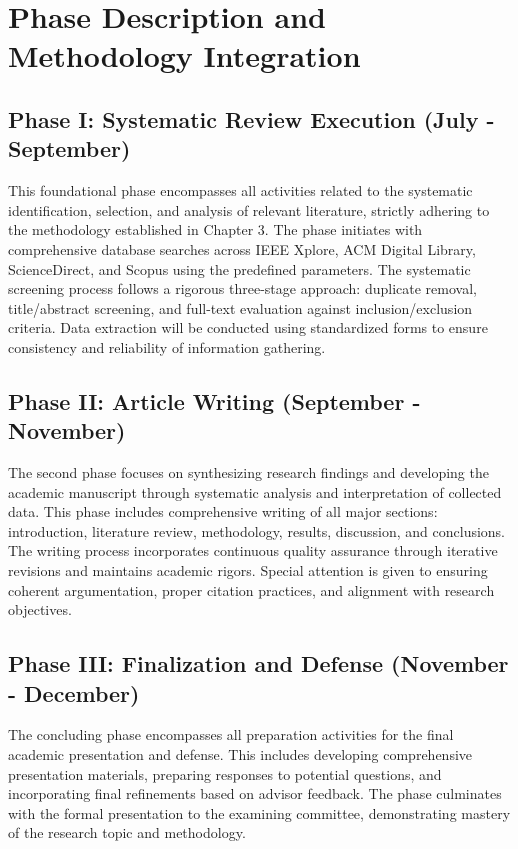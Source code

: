 \documentclass[twoside,brazilian,english]{UNISINOSmonografia}
\begin{document}
\section{Phase Description and Methodology Integration}

\subsection{Phase I: Systematic Review Execution (July - September)}
This foundational phase encompasses all activities related to the systematic identification, selection, and analysis of relevant literature, strictly adhering to the methodology established in Chapter 3. The phase initiates with comprehensive database searches across IEEE Xplore, ACM Digital Library, ScienceDirect, and Scopus using the predefined parameters. The systematic screening process follows a rigorous three-stage approach: duplicate removal, title/abstract screening, and full-text evaluation against inclusion/exclusion criteria. Data extraction will be conducted using standardized forms to ensure consistency and reliability of information gathering.

\subsection{Phase II: Article Writing (September - November)}  
The second phase focuses on synthesizing research findings and developing the academic manuscript through systematic analysis and interpretation of collected data. This phase includes comprehensive writing of all major sections: introduction, literature review, methodology, results, discussion, and conclusions. The writing process incorporates continuous quality assurance through iterative revisions and maintains academic rigors. Special attention is given to ensuring coherent argumentation, proper citation practices, and alignment with research objectives.

\subsection{Phase III: Finalization and Defense (November - December)}
The concluding phase encompasses all preparation activities for the final academic presentation and defense. This includes developing comprehensive presentation materials, preparing responses to potential questions, and incorporating final refinements based on advisor feedback. The phase culminates with the formal presentation to the examining committee, demonstrating mastery of the research topic and methodology.
\end{document}
